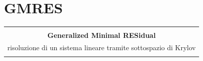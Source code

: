 \documentclass[10pt]{beamer}
\begin{document}





\section{GMRES}\label{sec:sec3}


\begin{frame} 
\begin{center}
\begin{tabular}{ c }
\hline\\
\textbf{Generalized Minimal RESidual} \\ [0.5ex]
risoluzione di un sistema lineare tramite sottospazio di Krylov\\ \\
 \hline
\end{tabular}
\end{center}
\end{frame}
\end{document}
